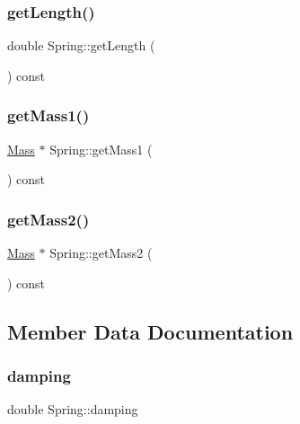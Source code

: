 \mbox{\label{classSpring_abac33a6e28978c4b09cee7f4709b9387}} 
\subsubsection{\texorpdfstring{get\+Length()}{getLength()}}
{\footnotesize\ttfamily double Spring\+::get\+Length (\begin{DoxyParamCaption}{ }\end{DoxyParamCaption}) const}

\mbox{\label{classSpring_af5b4786fc1829f556755c390a7c461bc}} 
\subsubsection{\texorpdfstring{get\+Mass1()}{getMass1()}}
{\footnotesize\ttfamily \hyperlink{classMass}{Mass} $\ast$ Spring\+::get\+Mass1 (\begin{DoxyParamCaption}{ }\end{DoxyParamCaption}) const}

\mbox{\label{classSpring_abcb4acf6d6f01eeff3b20c59674c05d3}} 
\subsubsection{\texorpdfstring{get\+Mass2()}{getMass2()}}
{\footnotesize\ttfamily \hyperlink{classMass}{Mass} $\ast$ Spring\+::get\+Mass2 (\begin{DoxyParamCaption}{ }\end{DoxyParamCaption}) const}



\subsection{Member Data Documentation}
\mbox{\label{classSpring_a3f82602a9f227c354d537fbf6c0344ec}} 
\subsubsection{\texorpdfstring{damping}{damping}}
{\footnotesize\ttfamily double Spring\+::damping\hspace{0.3cm}{\ttfamily [protected]}}

